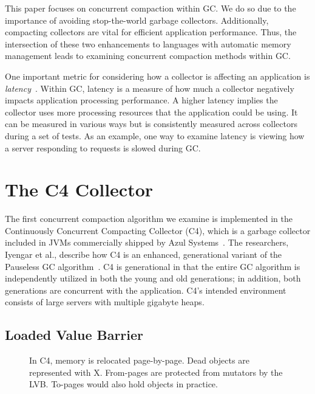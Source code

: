 \documentclass{sig-alternate}
\begin{document}
This paper focuses on
concurrent compaction within GC. We do so due to the importance 
of avoiding stop-the-world garbage collectors. Additionally, compacting
collectors are vital for efficient application performance. Thus,
the intersection of these two enhancements to languages with automatic memory management leads
to examining concurrent compaction methods within GC.

One important metric for considering
how a collector is affecting an application is \emph{latency}~\cite{Lindblom:2011}.
Within GC, latency is a measure of how much a collector negatively impacts
application processing performance. A higher latency implies the collector
uses more processing resources that the application could be using. It 
can be measured in various ways but is consistently measured across 
collectors during a set of tests. As an example, one way to
examine latency is viewing how a server responding to requests is slowed
during GC.


\section{The C4 Collector}
\label{sec:c4}

The first concurrent compaction algorithm we examine is implemented in the 
Continuously Concurrent Compacting Collector (C4), which is a garbage collector 
included in JVMs commercially shipped by Azul Systems~\cite{Tene:C4}. The 
researchers, Iyengar et al., describe how C4 is an enhanced, generational variant
of the Pauseless GC algorithm~\cite{Click:Pauseless}. C4 is generational in 
that the entire GC algorithm is independently utilized in both the young and old generations;
in addition, both generations are concurrent with the application. 
C4's intended environment consists of large servers with multiple gigabyte heaps.


\subsection{Loaded Value Barrier}
\label{sec:c4LVB}

\begin{figure}
\centering
{}
\caption{In C4, memory is relocated
page-by-page. Dead objects are represented with X.
From-pages are protected from mutators by the LVB.
To-pages would also hold objects in practice.}
\label{fig:c4Memory}
\end{figure}

\end{document}

